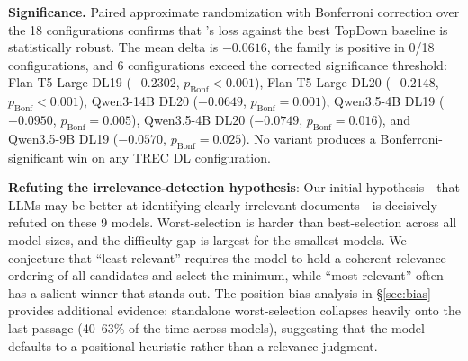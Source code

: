\textbf{Significance.} Paired approximate randomization with Bonferroni correction over the 18 configurations confirms that \bottomup{}'s loss against the best TopDown baseline is statistically robust. The mean delta is $-0.0616$, the family is positive in 0/18 configurations, and 6 configurations exceed the corrected significance threshold: Flan-T5-Large DL19 ($-0.2302$, $p_\text{Bonf}<0.001$), Flan-T5-Large DL20 ($-0.2148$, $p_\text{Bonf}<0.001$), Qwen3-14B DL20 ($-0.0649$, $p_\text{Bonf}=0.001$), Qwen3.5-4B DL19 ($-0.0950$, $p_\text{Bonf}=0.005$), Qwen3.5-4B DL20 ($-0.0749$, $p_\text{Bonf}=0.016$), and Qwen3.5-9B DL19 ($-0.0570$, $p_\text{Bonf}=0.025$). No \bottomup{} variant produces a Bonferroni-significant win on any TREC DL configuration.

\textbf{Refuting the irrelevance-detection hypothesis}: Our initial hypothesis---that LLMs may be better at identifying clearly irrelevant documents---is decisively refuted on these 9 models. Worst-selection is harder than best-selection across all model sizes, and the difficulty gap is largest for the smallest models. We conjecture that ``least relevant'' requires the model to hold a coherent relevance ordering of all candidates and select the minimum, while ``most relevant'' often has a salient winner that stands out. The position-bias analysis in \S\ref{sec:bias} provides additional evidence: standalone worst-selection collapses heavily onto the last passage (40--63\% of the time across models), suggesting that the model defaults to a positional heuristic rather than a relevance judgment.

